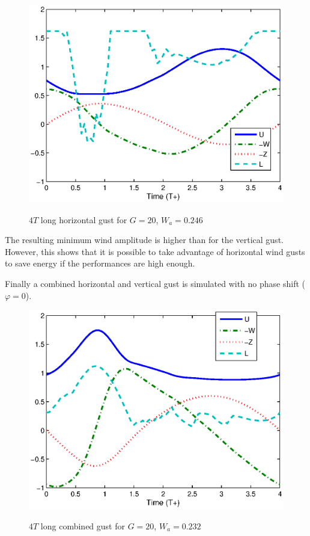 \begin{figure}[h]
  \begin{center}
    \scalebox{1.0}
    {\includegraphics{./Figures/Windtype=2_Tg=4_Wg=0p246_quad_G=20.eps}}
  \end{center}
  \caption{$4T$ long horizontal gust for $G=20$, $W_a=0.246$}
  \label{fig:Horizontal_optimization}
\end{figure}

\FloatBarrier

The resulting minimum wind amplitude is higher than for the vertical gust. 
However, this shows that it is possible to take advantage of horizontal wind gusts to save energy if the performances are high enough.

\par Finally a combined horizontal and vertical gust is simulated with no phase shift ($\varphi=0$).

\begin{figure}[h]
  \begin{center}
    \scalebox{1.0}
    {\includegraphics{./Figures/Windtype=3_Tg=4_Wg=0p232_quad_G=20.eps}}
  \end{center}
  \caption{$4T$ long combined gust for $G=20$, $W_a=0.232$}
  \label{fig:combined_optimization}
\end{figure}

